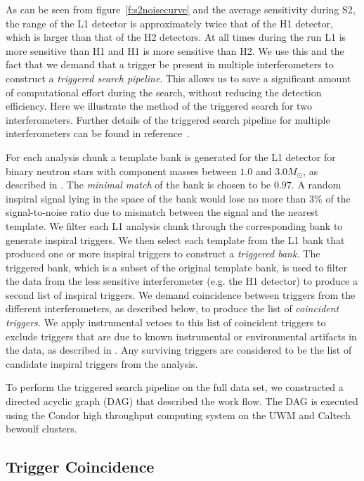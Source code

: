 As can be seen from figure~\ref{f:s2noisecurve} and the average sensitivity
during S2, the range of the L1 detector is approximately twice that of the H1
detector, which is larger than that of the H2 detectors. At all times during
the run L1 is more sensitive than H1 and H1 is more sensitive than H2. We use
this and the fact that we demand that a trigger be present in multiple
interferometers to construct a \emph{triggered search pipeline}. This allows
us to save a significant amount of computational effort during the search,
without reducing the detection efficiency. Here we illustrate the method of
the triggered search for two interferometers. Further details of the triggered
search pipeline for multiple interferometers can be found in
reference~\cite{abbott2004a}.

For each analysis chunk a template bank is generated for the L1 detector for
binary neutron stars with component masses between $1.0$ and $3.0 M_\odot$, as
described in \cite{owensathya}.  The \emph{minimal match} of the bank is
chosen to be $0.97$. A random inspiral signal lying in the space of the bank
would lose no more than $3\%$ of the signal-to-noise ratio due to mismatch
between the signal and the nearest template. We filter each L1 analysis chunk
through the corresponding bank to generate inspiral triggers. We then select
each template from the L1 bank that produced one or more inspiral triggers to
construct a \emph{triggered bank.} The triggered bank, which is a subset of
the original template bank, is used to filter the data from the less sensitive
interferometer (e.g. the H1 detector) to produce a second list of inspiral
triggers. We demand coincidence between triggers from the different
interferometers, as described below, to produce the list of \emph{coincident
triggers.} We apply instrumental vetoes to this list of coincident triggers to
exclude triggers that are due to known instrumental or environmental artifacts
in the data, as described in \cite{gwdawveto}. Any surviving triggers are
considered to be the list of candidate inspiral triggers from the analysis.

To perform the triggered search pipeline on the full data set, we constructed
a directed acyclic graph (DAG) that described the work flow.  The DAG is
executed using the Condor high throughput computing system\cite{condor} on the
UWM and Caltech bewoulf clusters.

\subsection{Trigger Coincidence}
\label{ss:coincidence}

